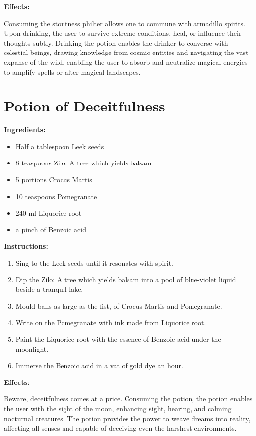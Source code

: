 \documentclass{article}
\begin{document}
\textbf{Effects:}

Consuming the stoutness philter allows one to commune with armadillo spirits. Upon drinking, the user to survive extreme conditions, heal, or influence their thoughts subtly. Drinking the potion enables the drinker to converse with celestial beings, drawing knowledge from cosmic entities and navigating the vast expanse of the wild, enabling the user to absorb and neutralize magical energies to amplify spells or alter magical landscapes.

\newpage
\section*{Potion of Deceitfulness}

\textbf{Ingredients:}

\begin{itemize}
  \item Half a tablespoon Leek seeds
  \item 8 teaspoons Zilo: A tree which yields balsam
  \item 5 portions Crocus Martis
  \item 10 teaspoons Pomegranate
  \item 240 ml Liquorice root
  \item a pinch of Benzoic acid
\end{itemize}

\textbf{Instructions:}

\begin{enumerate}
  \item Sing to the Leek seeds until it resonates with spirit.
  \item Dip the Zilo: A tree which yields balsam into a pool of blue-violet liquid beside a tranquil lake.
  \item Mould balls as large as the fist, of Crocus Martis and Pomegranate.
  \item Write on the Pomegranate with ink made from Liquorice root.
  \item Paint the Liquorice root with the essence of Benzoic acid under the moonlight.
  \item Immerse the Benzoic acid in a vat of gold dye an hour.
\end{enumerate}

\textbf{Effects:}

Beware, deceitfulness comes at a price. Consuming the potion, the potion enables the user with the sight of the moon, enhancing sight, hearing, and calming nocturnal creatures. The potion provides the power to weave dreams into reality, affecting all senses and capable of deceiving even the harshest environments.
\end{document}

